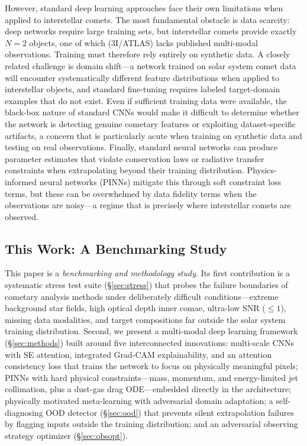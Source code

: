 \documentclass[usenatbib]{mnras}
\begin{document}
However, standard deep learning approaches face their own limitations when applied to interstellar comets. The most fundamental obstacle is data scarcity: deep networks require large training sets, but interstellar comets provide exactly $N=2$ objects, one of which (3I/ATLAS) lacks published multi-modal observations. Training must therefore rely entirely on synthetic data. A closely related challenge is domain shift---a network trained on solar system comet data will encounter systematically different feature distributions when applied to interstellar objects, and standard fine-tuning requires labeled target-domain examples that do not exist. Even if sufficient training data were available, the black-box nature of standard CNNs would make it difficult to determine whether the network is detecting genuine cometary features or exploiting dataset-specific artifacts, a concern that is particularly acute when training on synthetic data and testing on real observations. Finally, standard neural networks can produce parameter estimates that violate conservation laws or radiative transfer constraints when extrapolating beyond their training distribution. Physics-informed neural networks (PINNs) mitigate this through soft constraint loss terms, but these can be overwhelmed by data fidelity terms when the observations are noisy---a regime that is precisely where interstellar comets are observed.

\subsection{This Work: A Benchmarking Study}

This paper is a \textit{benchmarking and methodology study}. Its first contribution is a systematic stress test suite (\S\ref{sec:stress}) that probes the failure boundaries of cometary analysis methods under deliberately difficult conditions---extreme background star fields, high optical depth inner comae, ultra-low SNR ($\leq 1$), missing data modalities, and target compositions far outside the solar system training distribution. Second, we present a multi-modal deep learning framework (\S\ref{sec:methods}) built around five interconnected innovations: multi-scale CNNs with SE attention, integrated Grad-CAM explainability, and an attention consistency loss that trains the network to focus on physically meaningful pixels; PINNs with hard physical constraints---mass, momentum, and energy-limited jet collimation, plus a dust-gas drag ODE---embedded directly in the architecture; physically motivated meta-learning with adversarial domain adaptation; a self-diagnosing OOD detector (\S\ref{sec:ood}) that prevents silent extrapolation failures by flagging inputs outside the training distribution; and an adversarial observing strategy optimizer (\S\ref{sec:obsopt}).
\end{document}
